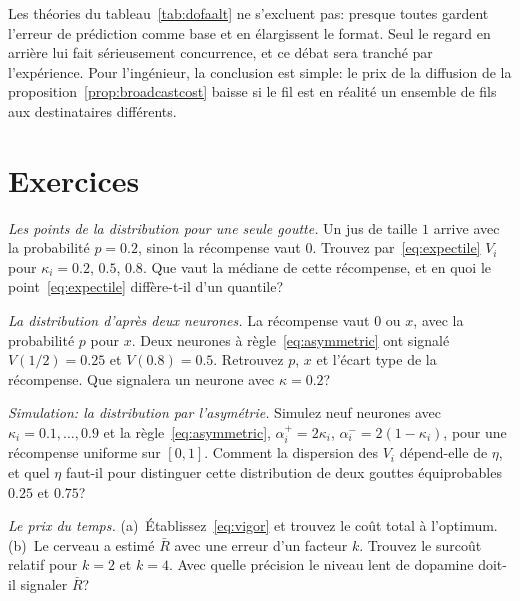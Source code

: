 Les théories du tableau~\ref{tab:dofaalt} ne s'excluent pas: presque toutes gardent l'erreur de prédiction comme base et en élargissent le format. Seul le regard en arrière lui fait sérieusement concurrence, et ce débat sera tranché par l'expérience. Pour l'ingénieur, la conclusion est simple: le prix de la diffusion de la proposition~\ref{prop:broadcastcost} baisse si le fil est en réalité un ensemble de fils aux destinataires différents.

\section{Exercices}

\begin{exercise}[\lvlA]
\label{ex:07:1}
\emph{Les points de la distribution pour une seule goutte.} Un jus de taille $1$ arrive avec la probabilité $p=0.2$, sinon la récompense vaut $0$. Trouvez par~\eqref{eq:expectile} $V_i$ pour $\kappa_i=0.2$, $0.5$, $0.8$. Que vaut la médiane de cette récompense, et en quoi le point~\eqref{eq:expectile} diffère-t-il d'un quantile?
\end{exercise}

\begin{exercise}[\lvlB]
\label{ex:07:2}
\emph{La distribution d'après deux neurones.} La récompense vaut $0$ ou $x$, avec la probabilité $p$ pour $x$. Deux neurones à règle~\eqref{eq:asymmetric} ont signalé $V(1/2)=0.25$ et $V(0.8)=0.5$. Retrouvez $p$, $x$ et l'écart type de la récompense. Que signalera un neurone avec $\kappa=0.2$?
\end{exercise}

\begin{exercise}[\lvlB]
\label{ex:07:3}
\emph{Simulation: la distribution par l'asymétrie.} Simulez neuf neurones  avec $\kappa_i=0.1,\dots,0.9$ et la règle~\eqref{eq:asymmetric}, $\alpha_i^+=2\kappa_i$, $\alpha_i^-=2(1-\kappa_i)$, pour une récompense uniforme sur $[0,1]$. Comment la dispersion des $V_i$ dépend-elle de $\eta$, et quel $\eta$ faut-il pour distinguer cette distribution de deux gouttes équiprobables $0.25$ et $0.75$?
\end{exercise}

\begin{exercise}[\lvlA]
\label{ex:07:4}
\emph{Le prix du temps.} (a)~Établissez~\eqref{eq:vigor} et trouvez le coût total à l'optimum. (b)~Le cerveau a estimé $\bar R$ avec une erreur d'un facteur $k$. Trouvez le surcoût relatif pour $k=2$ et $k=4$. Avec quelle précision le niveau lent de dopamine doit-il signaler $\bar R$?
\end{exercise}

